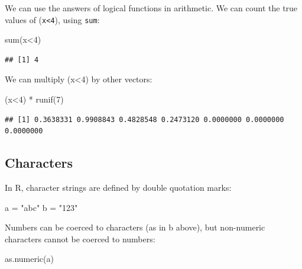 \documentclass[
]{book}
\newenvironment{Shaded}{\begin{snugshade}}{\end{snugshade}}
\newcommand{\DecValTok}[1]{\textcolor[rgb]{0.00,0.00,0.81}{#1}}
\newcommand{\FunctionTok}[1]{\textcolor[rgb]{0.00,0.00,0.00}{#1}}
\newcommand{\NormalTok}[1]{#1}
\newcommand{\OtherTok}[1]{\textcolor[rgb]{0.56,0.35,0.01}{#1}}
\newcommand{\SpecialCharTok}[1]{\textcolor[rgb]{0.00,0.00,0.00}{#1}}
\newcommand{\StringTok}[1]{\textcolor[rgb]{0.31,0.60,0.02}{#1}}
\theoremstyle{definition}
\theoremstyle{definition}
\theoremstyle{definition}
\theoremstyle{definition}
\theoremstyle{remark}
\begin{document}
We can use the answers of logical functions in arithmetic. We can count the true values of (\texttt{x\textless{}4}), using \texttt{sum}:

\begin{Shaded}
\begin{Highlighting}[]
\FunctionTok{sum}\NormalTok{(x}\SpecialCharTok{\textless{}}\DecValTok{4}\NormalTok{)}
\end{Highlighting}
\end{Shaded}

\begin{verbatim}
## [1] 4
\end{verbatim}

We can multiply (x\textless4) by other vectors:

\begin{Shaded}
\begin{Highlighting}[]
\NormalTok{(x}\SpecialCharTok{\textless{}}\DecValTok{4}\NormalTok{) }\SpecialCharTok{*} \FunctionTok{runif}\NormalTok{(}\DecValTok{7}\NormalTok{)}
\end{Highlighting}
\end{Shaded}

\begin{verbatim}
## [1] 0.3638331 0.9908843 0.4828548 0.2473120 0.0000000 0.0000000 0.0000000
\end{verbatim}

\hypertarget{characters}{%
\subsection{Characters}\label{characters}}

In R, character strings are defined by double quotation marks:

\begin{Shaded}
\begin{Highlighting}[]
\NormalTok{a }\OtherTok{=} \StringTok{"abc"}
\NormalTok{b }\OtherTok{=} \StringTok{"123"}
\end{Highlighting}
\end{Shaded}

Numbers can be coerced to characters (as in b above), but non-numeric characters cannot be coerced to
numbers:

\begin{Shaded}
\begin{Highlighting}[]
\FunctionTok{as.numeric}\NormalTok{(a)}
\end{Highlighting}
\end{Shaded}
\end{document}
